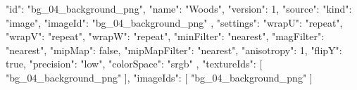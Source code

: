 {
  "id": "bg_04_background_png",
  "name": "Woods",
  "version": 1,
  "source": {
    "kind": "image",
    "imageId": "bg_04_background_png"
  },
  "settings": {
    "wrapU": "repeat",
    "wrapV": "repeat",
    "wrapW": "repeat",
    "minFilter": "nearest",
    "magFilter": "nearest",
    "mipMap": false,
    "mipMapFilter": "nearest",
    "anisotropy": 1,
    "flipY": true,
    "precision": "low",
    "colorSpace": "srgb"
  },
  "textureIds": [
    "bg_04_background_png"
  ],
  "imageIds": [
    "bg_04_background_png"
  ]
}
